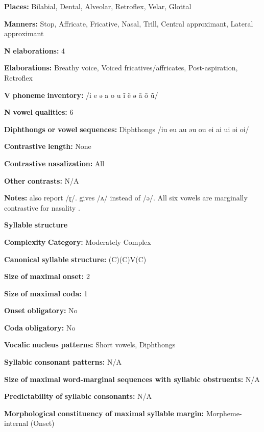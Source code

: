 \begin{styleBody}
\textbf{Places:} Bilabial, Dental, Alveolar, Retroflex, Velar, Glottal

\textbf{Manners:} Stop, Affricate, Fricative, Nasal, Trill, Central approximant, Lateral approximant

\textbf{N} \textbf{elaborations:} 4

\textbf{Elaborations:} Breathy voice, Voiced fricatives/affricates, Post-aspiration, Retroflex

\textbf{V} \textbf{phoneme} \textbf{inventory:} /i e ə a o u ĩ ẽ ə ã õ ũ/

\textbf{N} \textbf{vowel} \textbf{qualities:} 6

\textbf{Diphthongs} \textbf{or} \textbf{vowel} \textbf{sequences:} Diphthongs /iu eu au əu ou ei ai ui əi oi/

\textbf{Contrastive} \textbf{length:} None

\textbf{Contrastive} \textbf{nasalization:} All

\textbf{Other} \textbf{contrasts:} N/A

\textbf{Notes:} \citet{KotapishKotapish1973} also report /ɽ/. \citet{Paudyal2003} gives /ʌ/ instead of /ə/. All six vowels are marginally contrastive for nasality \citep[7]{Dhakal2012}.

\textbf{Syllable} \textbf{structure}

\textbf{Complexity} \textbf{Category:} Moderately Complex

\textbf{Canonical} \textbf{syllable} \textbf{structure:} (C)(C)V(C) \citep[17-20]{Dhakal2012}

\textbf{Size} \textbf{of} \textbf{maximal} \textbf{onset:} 2

\textbf{Size} \textbf{of} \textbf{maximal} \textbf{coda:} 1

\textbf{Onset} \textbf{obligatory:} No

\textbf{Coda} \textbf{obligatory:} No

\textbf{Vocalic} \textbf{nucleus} \textbf{patterns:} Short vowels, Diphthongs

\textbf{Syllabic} \textbf{consonant} \textbf{patterns:} N/A

\textbf{Size} \textbf{of} \textbf{maximal} \textbf{word{}-marginal sequences with syllabic obstruents:} N/A

\textbf{Predictability} \textbf{of} \textbf{syllabic} \textbf{consonants:} N/A

\textbf{Morphological} \textbf{constituency} \textbf{of} \textbf{maximal} \textbf{syllable} \textbf{margin:} Morpheme-internal (Onset)


\end{styleBody}
